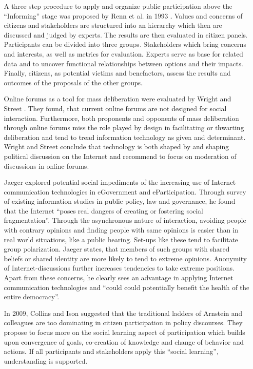 A three step procedure to apply and organize public participation above the ``Informing'' stage was proposed by Renn et al. in 1993 \cite{Renn1993_participation}. Values and concerns of citizens and stakeholders are structured into an hierarchy which then are discussed and judged by experts. The results are then evaluated in citizen panels. Participants can be divided into three groups. Stakeholders which bring concerns and interests, as well as metrics for evaluation. Experts serve as base for related data and to uncover functional relationships between options and their impacts. Finally, citizens, as potential victims and benefactors, assess the results and outcomes of the proposals of the other groups.

Online forums as a tool for mass deliberation were evaluated by Wright and Street \cite{Wright2007_deliberation_design}. They found, that current online forums are not designed for social interaction. Furthermore, both proponents and opponents of mass deliberation through online forums miss the role played by design in facilitating or thwarting deliberation and tend to tread information technology as given and determinant. Wright and Street conclude that technology is both shaped by and shaping political discussion on the Internet and recommend to focus on moderation of discussions in online forums.

Jaeger \cite{Jaeger2005_deliberate_democracy_and_egovernment} explored potential social impediments of the increasing use of Internet communication technologies in eGovernment and eParticipation. Through survey of existing information studies in public policy, law and governance, he found that the Internet ``poses real dangers of creating or fostering social fragmentation''. Through the asynchronous nature of interaction, avoiding people with contrary opinions and finding people with same opinions is easier than in real world situations, like a public hearing. Set-ups like these tend to facilitate group polarization. Jaeger states, that members of such groups with shared beliefs or shared identity are more likely to tend to extreme opinions. Anonymity of Internet-discussions further increases tendencies to take extreme positions. Apart from these concerns, he clearly sees an advantage in applying Internet communication technologies and ``could could potentially benefit the health of the entire democracy''.

In 2009, Collins and Ison \cite{Collins2009_social_learning} suggested that the traditional ladders of Arnstein and colleagues are too dominating in citizen participation in policy discourses. They propose to focus more on the social learning aspect of participation which builds upon convergence of goals, co-creation of knowledge and change of behavior and actions. If all participants and stakeholders apply this ``social learning'', understanding is supported.


